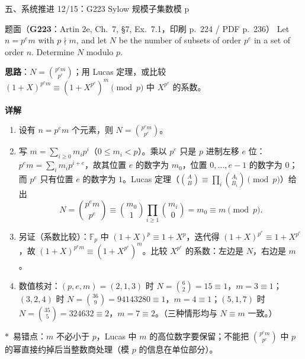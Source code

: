 \documentclass[aspectratio=169,10pt,fontset=none]{ctexbeamer}
\newcommand{\ex}[1]{\textcolor{accent}{\footnotesize\bfseries #1}}
\newcommand{\key}[1]{\textcolor{ink}{\bfseries #1}}
\newcommand{\starpt}{\textcolor{accent}{\bfseries$\ast$}}
\begin{document}
\begin{frame}[t]{五、系统推进 12/15：G223 Sylow 规模子集数模 p}
\label{ex:G223}\leavevmode
\scriptsize
\begin{block}{\footnotesize 题面（\ex{G223}：Artin 2e, Ch.~7, \S7, Ex.~7.1，印刷 p.~224 / PDF p.~236）}
Let $n=p^em$ with $p\nmid m$, and let $N$ be the number of subsets of order $p^e$ in a set of order $n$. Determine $N$ modulo $p$.
\end{block}
\key{思路}：$N=\binom{p^em}{p^e}$；用 Lucas 定理，或比较 $(1+X)^{p^em}\equiv(1+X^{p^e})^m\pmod p$ 中 $X^{p^e}$ 的系数。

\key{详解}
\begin{enumerate}
  \item 设有 $n=p^em$ 个元素，则 $N=\binom{p^em}{p^e}$。
  \item 写 $m=\sum_{i\ge0}m_ip^i$（$0\le m_i<p$）。乘以 $p^e$ 只是 $p$ 进制左移 $e$ 位：$p^em=\sum_i m_ip^{i+e}$，故其位置 $e$ 的数字为 $m_0$，位置 $0,\dots,e-1$ 的数字为 $0$；而 $p^e$ 只有位置 $e$ 的数字为 $1$。Lucas 定理（$\binom{A}{B}\equiv\prod_i\binom{A_i}{B_i}\pmod p$）给出
  \[ N=\binom{p^em}{p^e}\equiv\binom{m_0}{1}\prod_{i\ge1}\binom{m_i}{0}=m_0\equiv m\pmod p . \]
  \item 另证（系数比较）：$\mathbb F_p$ 中 $(1+X)^p\equiv1+X^p$，迭代得 $(1+X)^{p^e}\equiv1+X^{p^e}$，故 $(1+X)^{p^em}\equiv(1+X^{p^e})^m$。比较 $X^{p^e}$ 的系数：左边是 $N$，右边是 $m$。
  \item 数值核对：$(p,e,m)=(2,1,3)$ 时 $N=\binom62=15\equiv1$，$m=3\equiv1$；$(3,2,4)$ 时 $N=\binom{36}{9}=94143280\equiv1$，$m=4\equiv1$；$(5,1,7)$ 时 $N=\binom{35}{5}=324632\equiv2$，$m=7\equiv2$。（三种情形均与 $N\equiv m$ 一致。）
\end{enumerate}
\starpt~易错点：$m$ 不必小于 $p$，Lucas 中 $m$ 的高位数字要保留；不能把 $\binom{p^em}{p^e}$ 中 $p$ 的幂直接约掉后当整数商处理（模 $p$ 的信息在单位部分）。
\end{frame}
\end{document}
